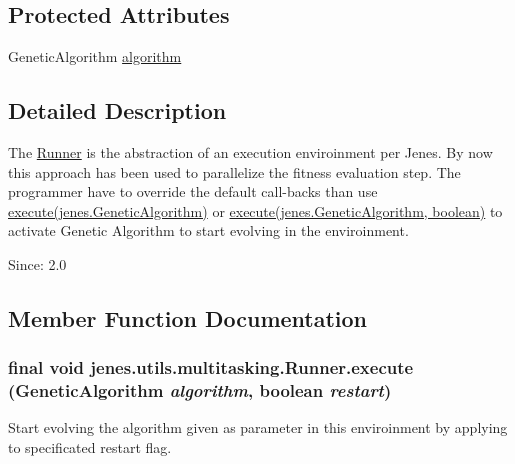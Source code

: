 \subsection*{Protected Attributes}
\begin{CompactItemize}
\item 
GeneticAlgorithm \hyperlink{classjenes_1_1utils_1_1multitasking_1_1_runner_699ccf526b6116f97abc09e4ce390c89}{algorithm}
\end{CompactItemize}


\subsection{Detailed Description}
The \hyperlink{classjenes_1_1utils_1_1multitasking_1_1_runner}{Runner} is the abstraction of an execution enviroinment per Jenes. By now this approach has been used to parallelize the fitness evaluation step. The programmer have to override the default call-backs than use \hyperlink{}{execute(jenes.GeneticAlgorithm)} or \hyperlink{}{execute(jenes.GeneticAlgorithm, boolean)} to activate Genetic Algorithm to start evolving in the enviroinment.

\begin{Desc}
\item[Since:]2.0 \end{Desc}


\subsection{Member Function Documentation}
\hypertarget{classjenes_1_1utils_1_1multitasking_1_1_runner_24d074cbd5140cd8bc65623fa1961f39}{
\subsubsection[execute]{\setlength{\rightskip}{0pt plus 5cm}final void jenes.utils.multitasking.Runner.execute (GeneticAlgorithm {\em algorithm}, \/  boolean {\em restart})}}
\label{classjenes_1_1utils_1_1multitasking_1_1_runner_24d074cbd5140cd8bc65623fa1961f39}


Start evolving the algorithm given as parameter in this enviroinment by applying to specificated restart flag.

